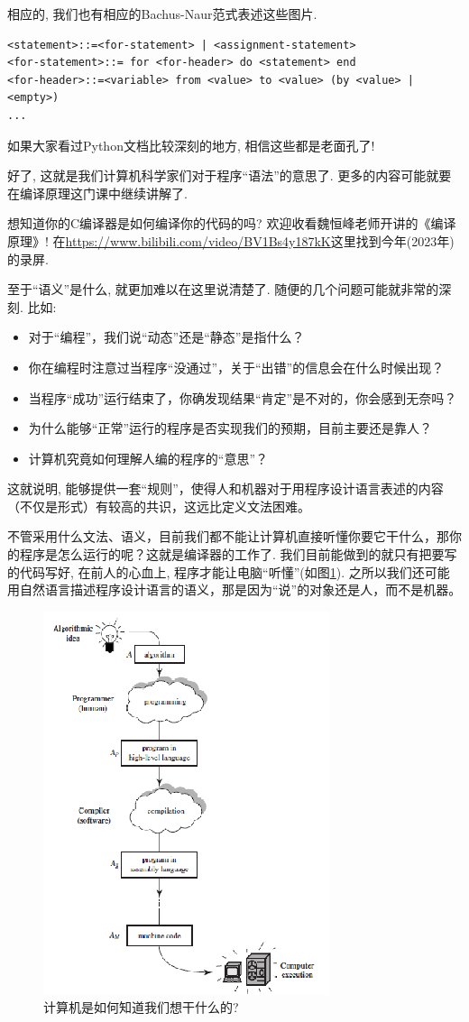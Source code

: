 相应的, 我们也有相应的Bachus-Naur范式表述这些图片. 

\begin{lstlisting}
<statement>::=<for-statement> | <assignment-statement>
<for-statement>::= for <for-header> do <statement> end
<for-header>::=<variable> from <value> to <value> (by <value> | <empty>)
...
\end{lstlisting}

如果大家看过Python文档比较深刻的地方, 相信这些都是老面孔了! 

好了, 这就是我们计算机科学家们对于程序``语法''的意思了. 更多的内容可能就要在编译原理这门课中继续讲解了. 

\begin{bonus}
	想知道你的C编译器是如何编译你的代码的吗? 欢迎收看魏恒峰老师开讲的《编译原理》! 在\url{https://www.bilibili.com/video/BV1Bs4y187kK}这里找到今年(2023年)的录屏. 
\end{bonus}

至于``语义''是什么, 就更加难以在这里说清楚了. 随便的几个问题可能就非常的深刻. 比如: 

\begin{itemize}
	\item 对于“编程”，我们说“动态”还是“静态”是指什么？
	\item 你在编程时注意过当程序“没通过”，关于“出错”的信息会在什么时候出现？
	\item 当程序“成功”运行结束了，你确发现结果“肯定”是不对的，你会感到无奈吗？
	\item 为什么能够“正常”运行的程序是否实现我们的预期，目前主要还是靠人？
	\item 计算机究竟如何理解人编的程序的“意思”？
\end{itemize}

这就说明, 能够提供一套“规则”，使得人和机器对于用程序设计语言表述的内容（不仅是形式）有较高的共识，这远比定义文法困难。

不管采用什么文法、语义，目前我们都不能让计算机直接听懂你要它干什么，那你的程序是怎么运行的呢？这就是编译器的工作了. 我们目前能做到的就只有把要写的代码写好, 在前人的心血上, 程序才能让电脑``听懂''(如图\ref{figs:do-we-want}). 之所以我们还可能用自然语言描述程序设计语言的语义，那是因为“说”的对象还是人，而不是机器。

\begin{figure}[h!]
	\centering
	\includegraphics[scale=0.8]{4-programs/figs/machine-note}
	\caption{计算机是如何知道我们想干什么的?}
	\label{figs:do-we-want}
	
\end{figure}
